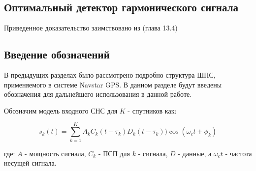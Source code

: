 \subsection{Оптимальный детектор гармонического сигнала}

Приведенное доказательство заимствовано из \cite{pugachev} (глава 13.4)

\subsection{Введение обозначений}
В предыдущих разделах было рассмотрено подробно структура ШПС, применяемого в системе Navstar GPS. В данном разделе
будут введены обозначения для дальнейшего использования в данной работе.

Обозначим модель входного СНС для ${K}$ - спутников как:
\begin{center}
\begin{equation}
	\label{eq:gps_model_1}
	s_k(t) = \sum_{k=1}^{K}{A_{k}C_{k}(t-\tau_k)D_{k}(t-\tau_k))\cos(\omega_{c}t + \phi_k)}
\end{equation}
\end{center}
где: ${A}$ - мощность сигнала, ${C_k}$ - ПСП для ${k}$ - сигнала, ${D}$ - данные, а ${\omega_{c}t}$ - частота несущей сигнала.

\newpage
